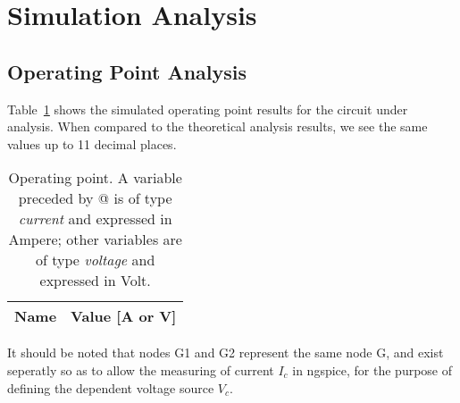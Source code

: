 \section{Simulation Analysis}
\label{sec:simulation}

\subsection{Operating Point Analysis}

Table~\ref{tab:op} shows the simulated operating point results for the circuit
under analysis. When compared to the theoretical analysis results, we see the same values
up to 11 decimal places.

\begin{table}[H]
  \centering
  \begin{tabular}{|l|r|}
    \hline    
    {\bf Name} & {\bf Value [A or V]} \\ \hline
    
  \end{tabular}
  \caption{Operating point. A variable preceded by @ is of type {\em current}
    and expressed in Ampere; other variables are of type {\it voltage} and expressed in
    Volt.}
  \label{tab:op}
\end{table}

It should be noted that nodes G1 and G2 represent the same node G, and exist seperatly
so as to allow the measuring of current $I_c$ in ngspice, for the purpose of defining the
dependent voltage source $V_c$.


